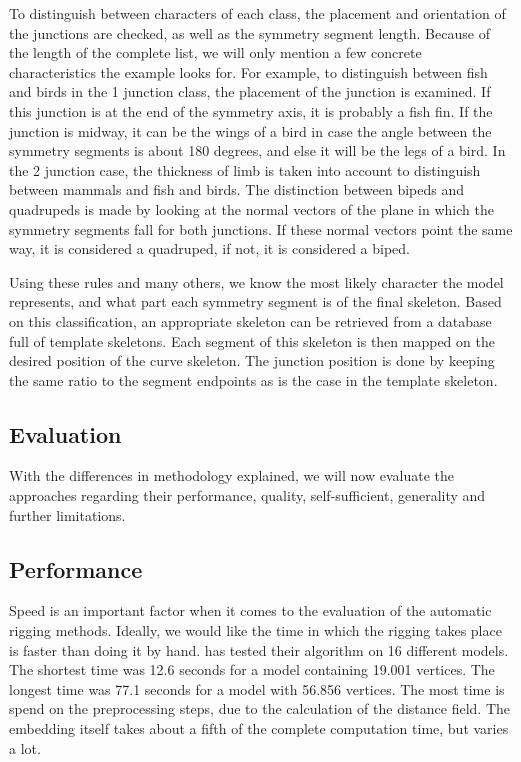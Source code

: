 \documentclass{article}
\begin{document}
To distinguish between characters of each class, the placement and orientation
of the junctions are checked, as well as the symmetry segment length. Because
of the length of the complete list, we will only mention a few concrete
characteristics the example looks for. For example, to distinguish between
fish and birds in the 1 junction class, the placement of the junction is
examined. If this junction is at the end of the symmetry axis, it is probably a
fish fin. If the junction is midway, it can be the wings of a bird in case the
angle between the symmetry segments is about 180 degrees, and else it will be the
legs of a bird. In the 2 junction case, the thickness of
limb is taken into account to distinguish between mammals and fish and birds.
The distinction between bipeds and quadrupeds is made by looking at the normal
vectors of the plane in which the symmetry segments fall for both junctions. If
these normal vectors point the same way, it is considered a quadruped, if not,
it is considered a biped. 

Using these rules and many others, we know the most likely character the model represents, and
what part each symmetry segment is of the final skeleton. Based on this
classification, an appropriate skeleton can be retrieved from a database full of
template skeletons. Each segment of this skeleton is then mapped on the desired
position of the curve skeleton. The junction position is done by keeping the
same ratio to the segment endpoints as is the case in the template skeleton.

\subsection{Evaluation}
With the differences in methodology explained, we will now evaluate the
approaches regarding their performance, quality, self-sufficient, generality and
further limitations.

\subsection{Performance}
Speed is an important factor when it comes to the evaluation of the automatic rigging
methods. Ideally, we would like the time in which the rigging takes place is
faster than doing it by hand. \citep{paper1} has tested their algorithm on 16
different models. The shortest time was 12.6 seconds for a model containing 19.001
vertices. The longest time was 77.1 seconds for a model with 56.856 vertices.
The most time is spend on the preprocessing steps, due to the calculation of the
distance field. The embedding itself takes about a fifth of the complete
computation time, but varies a lot.
\end{document}
